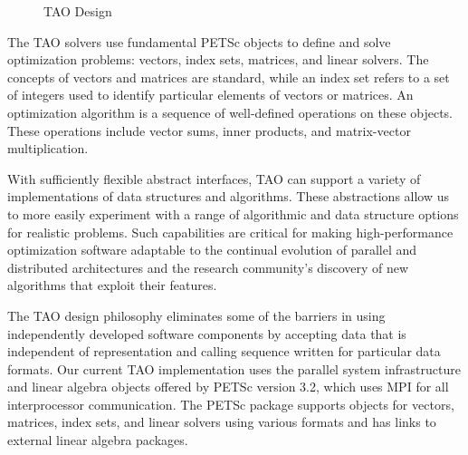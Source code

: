 \begin{figure}[ht]
\caption{TAO Design}
\label{tao:design}
\end{figure}



The TAO solvers use fundamental PETSc objects to define and solve
optimization problems: vectors, index sets, matrices, and linear
solvers.  The concepts of vectors and matrices are standard, while an
index set refers to a set of integers used to identify particular
elements of vectors or matrices.  An optimization algorithm is a
sequence of well-defined operations on these objects.  These
operations include vector sums, inner products, and matrix-vector
multiplication.

With sufficiently flexible abstract interfaces, TAO can support a
variety of implementations of data structures and algorithms.  These
abstractions allow us to more easily experiment with a range of
algorithmic and data structure options for realistic problems.  
Such capabilities are critical for making
high-performance optimization software adaptable to the continual
evolution of parallel and distributed architectures and the research
community's discovery of new algorithms that exploit their features.

The TAO design philosophy eliminates some of the barriers in using
independently developed software components by accepting data that is
independent of representation and calling sequence written for
particular data formats.  Our current TAO implementation uses 
the parallel system infrastructure and linear algebra objects 
offered by PETSc version 3.2, which uses MPI \cite{using-mpi} 
for all interprocessor communication.  The PETSc package supports 
objects for vectors, matrices, index sets, and linear solvers
using various formats and has links to external linear algebra
packages.

